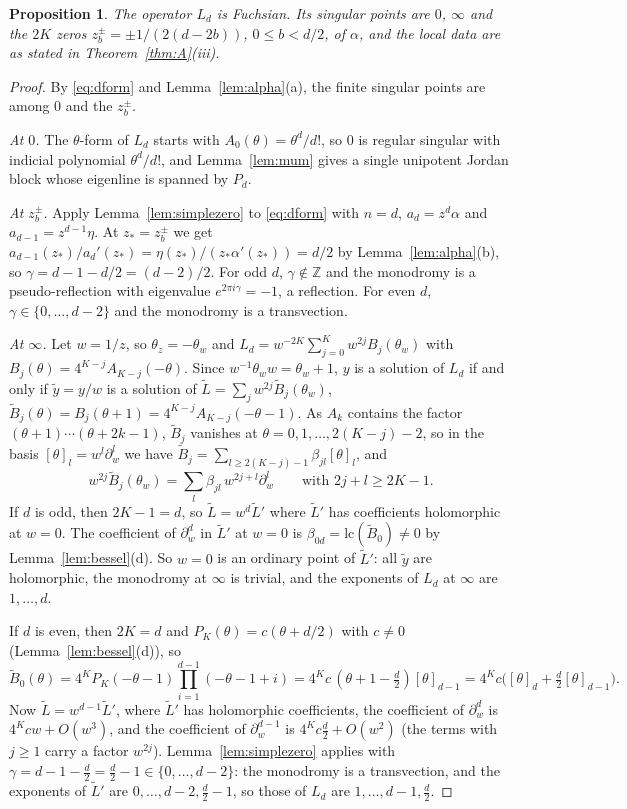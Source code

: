 \documentclass[11pt]{amsart}
\newtheorem{proposition}[thm]{Proposition}
\theoremstyle{definition}
\newcommand{\Z}{\mathbb Z}
\newcommand{\lc}{\mathrm{lc}}
\newcommand{\ff}[2]{[#1]_{#2}}
\begin{document}
\begin{proposition}\label{prop:local}
The operator $L_d$ is Fuchsian. Its singular points are $0$, $\infty$ and the $2K$ zeros $z_b^\pm=\pm1/(2(d-2b))$, $0\le b<d/2$, of $\alpha$, and the local data are as stated in Theorem~\ref{thm:A}\textup{(iii)}.
\end{proposition}

\begin{proof}
By \eqref{eq:dform} and Lemma~\ref{lem:alpha}(a), the finite singular points are among $0$ and the $z_b^\pm$.

\emph{At $0$.} The $\theta$-form of $L_d$ starts with $A_0(\theta)=\theta^d/d!$, so $0$ is regular singular with indicial polynomial $\theta^d/d!$, and Lemma~\ref{lem:mum} gives a single unipotent Jordan block whose eigenline is spanned by $P_d$.

\emph{At $z_b^\pm$.} Apply Lemma~\ref{lem:simplezero} to \eqref{eq:dform} with $n=d$, $a_d=z^d\alpha$ and $a_{d-1}=z^{d-1}\eta$. At $z_*=z_b^\pm$ we get $a_{d-1}(z_*)/a_d'(z_*)=\eta(z_*)/(z_*\alpha'(z_*))=d/2$ by Lemma~\ref{lem:alpha}(b), so $\gamma=d-1-d/2=(d-2)/2$. For odd $d$, $\gamma\notin\Z$ and the monodromy is a pseudo-reflection with eigenvalue $e^{2\pi i\gamma}=-1$, a reflection. For even $d$, $\gamma\in\{0,\dots,d-2\}$ and the monodromy is a transvection.

\emph{At $\infty$.} Let $w=1/z$, so $\theta_z=-\theta_w$ and $L_d=w^{-2K}\sum_{j=0}^Kw^{2j}B_j(\theta_w)$ with $B_j(\theta)=4^{K-j}A_{K-j}(-\theta)$. Since $w^{-1}\theta_ww=\theta_w+1$, $y$ is a solution of $L_d$ if and only if $\tilde y=y/w$ is a solution of $\tilde L=\sum_jw^{2j}\tilde B_j(\theta_w)$, $\tilde B_j(\theta)=B_j(\theta+1)=4^{K-j}A_{K-j}(-\theta-1)$. As $A_k$ contains the factor $(\theta+1)\cdots(\theta+2k-1)$, $\tilde B_j$ vanishes at $\theta=0,1,\dots,2(K-j)-2$, so in the basis $\ff\theta l=w^l\partial_w^l$ we have $\tilde B_j=\sum_{l\ge2(K-j)-1}\beta_{jl}\ff\theta l$, and
\[
w^{2j}\tilde B_j(\theta_w)=\sum_l\beta_{jl}\,w^{2j+l}\partial_w^l\qquad\text{with }2j+l\ge2K-1.
\]
If $d$ is odd, then $2K-1=d$, so $\tilde L=w^d\tilde L'$ where $\tilde L'$ has coefficients holomorphic at $w=0$. The coefficient of $\partial_w^d$ in $\tilde L'$ at $w=0$ is $\beta_{0d}=\lc(\tilde B_0)\ne0$ by Lemma~\ref{lem:bessel}(d). So $w=0$ is an ordinary point of $\tilde L'$: all $\tilde y$ are holomorphic, the monodromy at $\infty$ is trivial, and the exponents of $L_d$ at $\infty$ are $1,\dots,d$.

If $d$ is even, then $2K=d$ and $P_K(\theta)=c(\theta+d/2)$ with $c\ne0$ (Lemma~\ref{lem:bessel}(d)), so
\[
\tilde B_0(\theta)=4^KP_K(-\theta-1)\prod_{i=1}^{d-1}(-\theta-1+i)=4^Kc\,(\theta+1-\tfrac d2)\ff\theta{d-1}=4^Kc\bigl(\ff\theta d+\tfrac d2\ff\theta{d-1}\bigr).
\]
Now $\tilde L=w^{d-1}\tilde L'$, where $\tilde L'$ has holomorphic coefficients, the coefficient of $\partial_w^d$ is $4^Kcw+O(w^3)$, and the coefficient of $\partial_w^{d-1}$ is $4^Kc\frac d2+O(w^2)$ (the terms with $j\ge1$ carry a factor $w^{2j}$). Lemma~\ref{lem:simplezero} applies with $\gamma=d-1-\frac d2=\frac d2-1\in\{0,\dots,d-2\}$: the monodromy is a transvection, and the exponents of $\tilde L'$ are $0,\dots,d-2,\frac d2-1$, so those of $L_d$ are $1,\dots,d-1,\frac d2$.


\end{proof}
\end{document}
